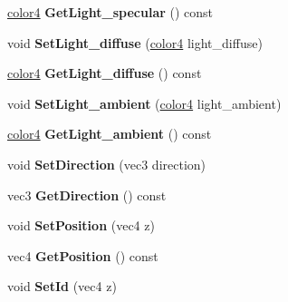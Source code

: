 \begin{DoxyCompactItemize}
\item 
\hypertarget{class_light_source_ab91668c8a2b5e9af25df5e96aef8f930}{\hyperlink{struct_angel_1_1vec4}{color4} {\bfseries Get\-Light\-\_\-specular} () const }\label{class_light_source_ab91668c8a2b5e9af25df5e96aef8f930}

\item 
\hypertarget{class_light_source_ab82544f5701c1d8b0fc4c2e052ed8a18}{void {\bfseries Set\-Light\-\_\-diffuse} (\hyperlink{struct_angel_1_1vec4}{color4} light\-\_\-diffuse)}\label{class_light_source_ab82544f5701c1d8b0fc4c2e052ed8a18}

\item 
\hypertarget{class_light_source_a3b1b4a97762e1cbb51c529166c82f657}{\hyperlink{struct_angel_1_1vec4}{color4} {\bfseries Get\-Light\-\_\-diffuse} () const }\label{class_light_source_a3b1b4a97762e1cbb51c529166c82f657}

\item 
\hypertarget{class_light_source_a61ebe99a604c6519d0e7e785dd26f004}{void {\bfseries Set\-Light\-\_\-ambient} (\hyperlink{struct_angel_1_1vec4}{color4} light\-\_\-ambient)}\label{class_light_source_a61ebe99a604c6519d0e7e785dd26f004}

\item 
\hypertarget{class_light_source_a87b3948456c4d45caa24b7cdd1e02058}{\hyperlink{struct_angel_1_1vec4}{color4} {\bfseries Get\-Light\-\_\-ambient} () const }\label{class_light_source_a87b3948456c4d45caa24b7cdd1e02058}

\item 
\hypertarget{class_light_source_a61eee0b1deb3c4f5835411680f3e8dd5}{void {\bfseries Set\-Direction} (vec3 direction)}\label{class_light_source_a61eee0b1deb3c4f5835411680f3e8dd5}

\item 
\hypertarget{class_light_source_a42a8e0e812de7b1236bb8e3171b98954}{vec3 {\bfseries Get\-Direction} () const }\label{class_light_source_a42a8e0e812de7b1236bb8e3171b98954}

\item 
\hypertarget{class_light_source_a99f1a22e8732f83bfd852002ec060735}{void {\bfseries Set\-Position} (vec4 z)}\label{class_light_source_a99f1a22e8732f83bfd852002ec060735}

\item 
\hypertarget{class_light_source_a6138846124ad72588cdab459516a5f1d}{vec4 {\bfseries Get\-Position} () const }\label{class_light_source_a6138846124ad72588cdab459516a5f1d}

\item 
\hypertarget{class_light_source_a0d8ad53dacd8e2ac34aa2fbce69f5de1}{void {\bfseries Set\-Id} (vec4 z)}\label{class_light_source_a0d8ad53dacd8e2ac34aa2fbce69f5de1}


\end{DoxyCompactItemize}

